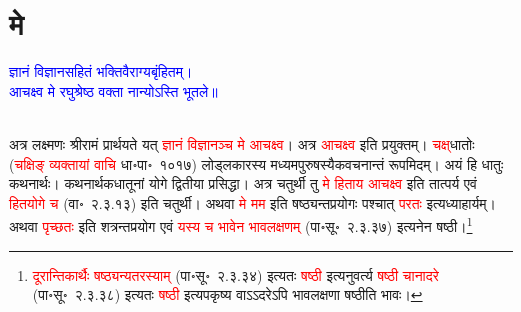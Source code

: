 \section[मे]{मे}
\centering\textcolor{blue}{ज्ञानं विज्ञानसहितं भक्तिवैराग्यबृंहितम्।\nopagebreak\\
आचक्ष्व मे रघुश्रेष्ठ वक्ता नान्योऽस्ति भूतले॥}\nopagebreak\\
\\
\begin{sloppypar}\justifying\noindent\hspace{10mm} अत्र लक्ष्मणः श्रीरामं प्रार्थयते यत् \textcolor{red}{ज्ञानं विज्ञानञ्च मे आचक्ष्व}। अत्र \textcolor{red}{आचक्ष्व} इति प्रयुक्तम्। \textcolor{red}{चक्ष्‌}\-धातोः (\textcolor{red}{चक्षिङ् व्यक्तायां वाचि} धा॰पा॰~१०१७) लोड्\-लकारस्य मध्यम\-पुरुषस्यैक\-वचनान्तं रूपमिदम्। अयं हि धातुः कथनार्थः। कथनार्थक\-धातूनां योगे द्वितीया प्रसिद्धा। अत्र चतुर्थी तु \textcolor{red}{मे हिताय आचक्ष्व} इति तात्पर्य एवं \textcolor{red}{हित\-योगे च} (वा॰~२.३.१३) इति चतुर्थी। अथवा \textcolor{red}{मे मम} इति षष्ठ्यन्त\-प्रयोगः पश्चात् \textcolor{red}{परतः} इत्यध्याहार्यम्। अथवा \textcolor{red}{पृच्छतः} इति शत्रन्त\-प्रयोग एवं \textcolor{red}{यस्य च भावेन भाव\-लक्षणम्‌} (पा॰सू॰~२.३.३७) इत्यनेन षष्ठी।\footnote{\textcolor{red}{दूरान्तिकार्थैः षष्ठ्यन्यतरस्याम्‌} (पा॰सू॰~२.३.३४) इत्यतः \textcolor{red}{षष्ठी} इत्यनुवर्त्य \textcolor{red}{षष्ठी चानादरे} (पा॰सू॰~२.३.३८) इत्यतः \textcolor{red}{षष्ठी} इत्यपकृष्य वाऽऽदरेऽपि भावलक्षणा षष्ठीति भावः।}\end{sloppypar}
